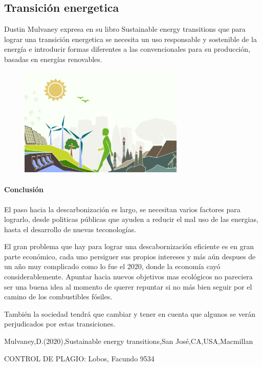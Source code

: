 \documentclass[runningheads]{llncs}
\begin{document}
\subsection{Transición energetica}
Dustin Mulvaney expresa en su libro Sustainable energy transitions que para lograr una transición energetica se necesita un uso responsable y sostenible de la energía e introducir formas diferentes a las convencionales para su producción, basadas en energías renovables.
\begin{figure}
\includegraphics[width=0.7\textwidth]{transicion-energetica-1.jpg}
\end{figure}

\paragraph{Conclusión}
El paso hacia la descarbonización es largo, se necesitan varios factores para lograrlo, desde politicas públicas que ayuden a reducir el mal uso de las energias, hasta el desarrollo de nuevas teconologías.

El gran problema que hay para lograr una descabornización eficiente es en gran parte económico, cada uno persiguer sus propios intereses y más aún despues de un año muy complicado como lo fue el 2020, donde la economía cayó considerablemente. Apuntar hacia nuevos objetivos mas ecológicos no pareciera ser una buena idea al momento de querer repuntar si no más bien seguir por el camino de los combustibles fósiles. 
  
 
 También la sociedad tendrá que cambiar y tener en cuenta que algunos se verán perjudicados por estas transiciones.






%
%


%
%
%
% 
% 
%
\begin{thebibliography}{8}
Mulvaney,D.(2020),Sustainable energy transitions,San José,CA,USA,Macmillan

\end{thebibliography}

 CONTROL DE PLAGIO:
Lobos, Facundo 9534 
\end{document}
